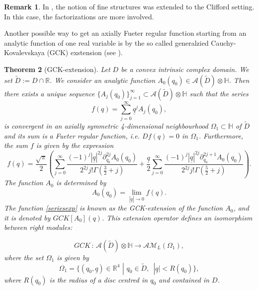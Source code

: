 \documentclass[reqno,11pt]{amsart}
\numberwithin{equation}{section}
\newtheorem{theorem}{Theorem}[section]
\theoremstyle{definition}
\newtheorem{remark}[theorem]{{\bf Remark}}
\begin{document}
\begin{remark}
In \cite{CDP25, CDP2026}, the notion of fine structures was extended to the Clifford setting. In this case, the factorizations are more involved.
\end{remark}


Another possible way to get an axially Fueter regular function starting from an analytic function of one real variable is by the so called generalzied Cauchy-Kovalevskaya (GCK) exstension (see \cite[Thm. 5.1.1]{green}).



\begin{theorem}[GCK-extension]
\label{gck}
Let $D$ be a convex intrinsic complex domain. We set $\tilde{D}:=D \cap \mathbb{R}$. We consider an analytic function $A_0(q_0) \in \mathcal{A}(\tilde{D}) \otimes \mathbb{H}$. Then there exists a unique sequence $ \{A_j(q_0)\}_{j=1}^\infty \subset \mathcal{A}(\tilde{D}) \otimes \mathbb{H}$ such that the series
\begin{equation}
\label{series1}
f(q)= \sum_{j=0}^\infty \underline{q}^j A_j(q_0),
\end{equation}
is convergent in an axially symmetric 4-dimensional neighbourhood $\Omega_1 \subset \mathbb{H}$ of $\tilde{D}$ and its sum is a Fueter regular function, i.e. $Df(q)=0$ in $\Omega_1$. Furthermore, the sum $f$ is  given by the expression
\begin{equation}
	\label{seriesexp}
	f(q)= \frac{\sqrt{\pi}}{2}\left( \sum_{j=0}^\infty \frac{(-1)^j |\underline{q}|^{2j} \partial_{q_0}^{2j} A_0(q_0)}{2^{2j}j! \Gamma \left(\frac{3}{2}+j\right)}+ \frac{\underline{q} }{2} \sum_{j=0}^\infty \frac{(-1)^j |\underline{q}|^{2j} \partial_{q_0}^{2j+1}A_0(q_0)}{2^{2j}j! \Gamma \left(\frac{5}{2}+j\right)} \right).
\end{equation}
The function $A_0$ is determined by
$$ A_0(q_0)=\lim_{|\underline{q}| \to 0} f(q).$$
 The function \eqref{seriesexp} is known as the GCK-extension of the function $A_0$, and it is denoted by $GCK[A_0](q)$. This extension operator defines an isomorphism between right modules:

$$ GCK \, : \, \mathcal{A}(\tilde{D}) \otimes \mathbb{H} \to \mathcal{AM}_L(\Omega_1),$$
where the set $\Omega_1$ is given by
\begin{equation}
\label{Stefano1}
\Omega_1=  \{(q_0, \underline{q}) \in \mathbb{R}^4 \, \, |\, \, q_0 \in \tilde{D}, \, \, \, |\underline{q}|< R(q_0)\},
\end{equation}
where $R(q_0)$ is the radius of a disc centred in $q_0$ and contained in $D$.
\end{theorem}
\end{document}
